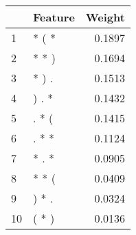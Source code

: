 \begin{tabular}{llr}
\toprule
{} & Feature &  Weight \\
\midrule
1  &   * ( * &  0.1897 \\
2  &   * * ) &  0.1694 \\
3  &   * ) . &  0.1513 \\
4  &   ) . * &  0.1432 \\
5  &   . * ( &  0.1415 \\
6  &   . * * &  0.1124 \\
7  &   * . * &  0.0905 \\
8  &   * * ( &  0.0409 \\
9  &   ) * . &  0.0324 \\
10 &   ( * ) &  0.0136 \\
\bottomrule
\end{tabular}
